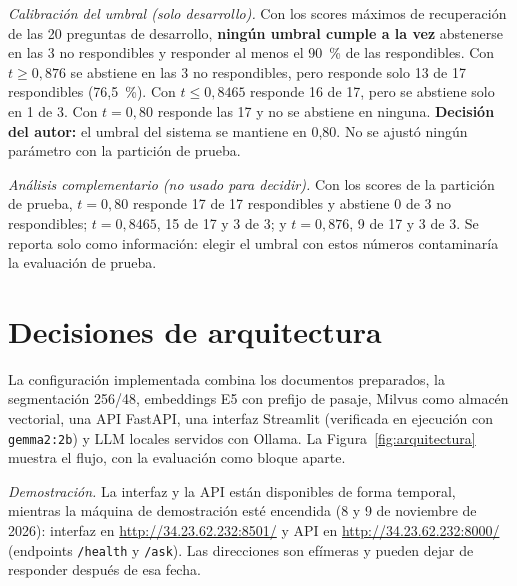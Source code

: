 \documentclass[conference]{IEEEtran}
\begin{document}
\textit{Calibración del umbral (solo desarrollo).} Con los scores máximos de recuperación de las 20 preguntas de desarrollo, \textbf{ningún umbral cumple a la vez} abstenerse en las 3 no respondibles y responder al menos el 90~\% de las respondibles. Con $t \geq 0{,}876$ se abstiene en las 3 no respondibles, pero responde solo 13 de 17 respondibles (76,5~\%). Con $t \leq 0{,}8465$ responde 16 de 17, pero se abstiene solo en 1 de 3. Con $t = 0{,}80$ responde las 17 y no se abstiene en ninguna. \textbf{Decisión del autor:} el umbral del sistema se mantiene en 0,80. No se ajustó ningún parámetro con la partición de prueba.

\textit{Análisis complementario (no usado para decidir).} Con los scores de la partición de prueba, $t = 0{,}80$ responde 17 de 17 respondibles y abstiene 0 de 3 no respondibles; $t = 0{,}8465$, 15 de 17 y 3 de 3; y $t = 0{,}876$, 9 de 17 y 3 de 3. Se reporta solo como información: elegir el umbral con estos números contaminaría la evaluación de prueba.

\section{Decisiones de arquitectura}
La configuración implementada combina los documentos preparados, la segmentación 256/48, embeddings E5 con prefijo de pasaje, Milvus como almacén vectorial, una API FastAPI, una interfaz Streamlit (verificada en ejecución con \texttt{gemma2:2b}) y LLM locales servidos con Ollama. La Figura~\ref{fig:arquitectura} muestra el flujo, con la evaluación como bloque aparte.

\textit{Demostración.} La interfaz y la API están disponibles de forma temporal, mientras la máquina de demostración esté encendida (8 y 9 de noviembre de 2026): interfaz en \url{http://34.23.62.232:8501/} y API en \url{http://34.23.62.232:8000/} (endpoints \texttt{/health} y \texttt{/ask}). Las direcciones son efímeras y pueden dejar de responder después de esa fecha.
\end{document}
